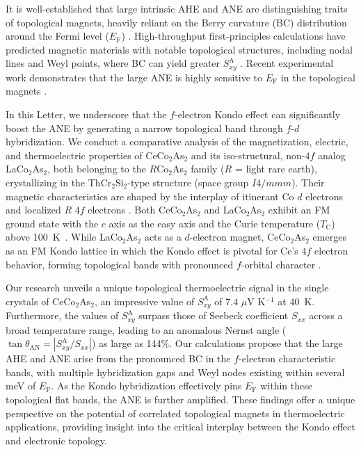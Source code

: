 \documentclass[aps,prl,preprint,superscriptaddress]{revtex4-2}
\begin{document}
It is well-established that large intrinsic AHE and ANE are distinguishing traits of topological magnets, heavily reliant on the Berry curvature (BC) distribution around the Fermi level ($E_{\mathrm{F}}$) \cite{BerryXiao2006, Mn3SnIkhlas2017,Co2MnGaSakai2018,Co3Sn2S2Guin2018,Fe3GeTe2Xu2019,Fe3GaSakai2020,Mn3GeXu2020,Fe3Sn2Zhang2021,UCoRuAlAsaba2021,YbMnBi2Pan2022,Fe3SnChen2022,CeCrGe3Li2024}.
High-throughput first-principles calculations have predicted magnetic materials with notable topological structures, including nodal lines and Weyl points, where   BC can yield greater $S^{\mathrm{A}}_{xy}$ \cite{Noky2018Ti2MnAl,Noky2019Fe2MnX,Noky2020Heusler,Fe3GaSakai2020}.
Recent experimental work demonstrates that the large ANE is highly sensitive to $E_{\mathrm{F}}$ in the topological magnets \cite{Li2023Fe3Sn2,Liu2023Co3Sn2S2FeNi}.

In this Letter, we underscore that the $f$-electron Kondo effect can significantly boost the ANE by generating a narrow topological band through $f$-$d$ hybridization.
We conduct a comparative analysis of the magnetization, electric, and thermoelectric properties of CeCo$_2$As$_2$ and its iso-structural, non-$4f$ analog LaCo$_2$As$_2$, both belonging to the $R$Co$_2$As$_2$ family ($R$ = light rare earth), crystallizing in the ThCr$_2$Si$_2$-type structure (space group $I4/mmm$).
Their magnetic characteristics are shaped by the interplay of itinerant Co $d$ electrons and localized $R$ $4f$ electrons \cite{CCAThompson2014,CCATan2018,Huang2023anomalous}.
Both CeCo$_2$As$_2$ and LaCo$_2$As$_2$ exhibit an FM ground state with the $c$ axis as the easy axis and the Curie temperature ($T_{\mathrm{C}}$) above 100~K~\cite{CCAThompson2014,CCATan2018}. While LaCo$_2$As$_2$ acts as a $d$-electron magnet, CeCo$_2$As$_2$ emerges as an FM Kondo lattice in which the Kondo effect is pivotal for Ce's $4f$ electron behavior, forming topological bands with pronounced $f$-orbital character \cite{CCAcheng2023}.

Our research unveils a unique topological thermoelectric signal in the single crystals of CeCo$_2$As$_2$, an impressive value of $S^{\mathrm{A}}_{xy}$ of $7.4$ $\mu$V K$^{-1}$ at 40~K.
Furthermore, the values of $S^{\mathrm{A}}_{xy}$ surpass those of Seebeck coefficient $S_{xx}$ across a broad temperature range, leading to an anomalous Nernst angle ($\tan\theta_{\mathrm{AN}} = \left| S^{\mathrm{A}}_{xy}/S_{xx} \right|$) as large as 144\%.
Our calculations propose that the large AHE and ANE arise from the pronounced BC in the $f$-electron characteristic bands, with multiple hybridization gaps and Weyl nodes existing within several meV of $E_{\mathrm{F}}$.
As the Kondo hybridization effectively pins $E_{\mathrm{F}}$ within these topological flat bands, the ANE is further amplified.
These findings offer a unique perspective on the potential of correlated topological magnets in thermoelectric applications, providing insight into the critical interplay between the Kondo effect and electronic topology.
\end{document}
